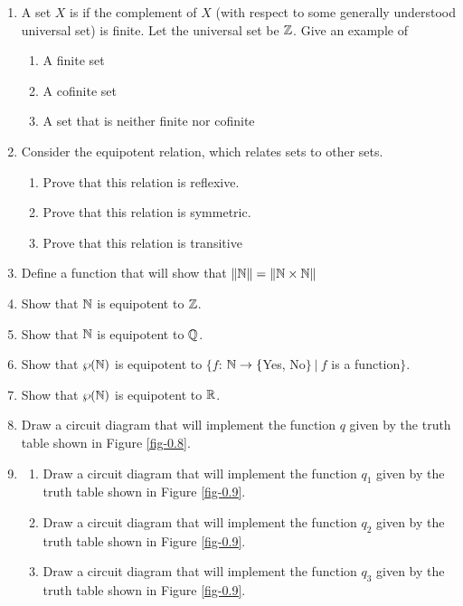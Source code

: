 \begin{enumerate}[{0.}1. ]
\item A set $X$ is \emph{} if the complement of $X$ (with respect to some generally
understood universal set) is finite. Let the universal set be $\mathbb{Z}$. Give an
example of
\begin{enumerate}
\item A finite set
\item A cofinite set
\item A set that is neither finite nor cofinite
\end{enumerate}

\item Consider the equipotent relation, which relates sets to other sets.
\begin{enumerate}
\item Prove that this relation is reflexive.
\item Prove that this relation is symmetric.
\item Prove that this relation is transitive
\end{enumerate}

\item Define a function that will show that $\|\mathbb{N}\| = \|\mathbb{N} \times \mathbb{N}\|$

\item Show that $\mathbb{N}$ is equipotent to $\mathbb{Z}$.

\item Show that $\mathbb{N}$ is equipotent to $\mathbb{Q}$.

\item Show that $\wp(\mathbb{N})$ is equipotent to $\{f$: $\mathbb{N}\rightarrow\{$Yes, No$\}
\ |\ f$ is a function$\}$.

\item Show that $\wp(\mathbb{N})$ is equipotent to $\mathbb{R}$.

\item Draw a circuit diagram that will implement the function $q$ given by the
truth table shown in Figure \ref{fig-0.8}.

\item \begin{enumerate}
\item Draw a circuit diagram that will implement the function $q_1$ given by the
truth table shown in Figure \ref{fig-0.9}.
\item Draw a circuit diagram that will implement the function $q_2$ given by the
truth table shown in Figure \ref{fig-0.9}.
\item Draw a circuit diagram that will implement the function $q_3$ given by the
truth table shown in Figure \ref{fig-0.9}.
\end{enumerate}
\end{enumerate}

